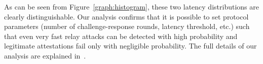 As can be seen from Figure~\ref{graph:histogram}, these two latency distributions are clearly distinguishable. Our analysis confirms that it is possible to set protocol parameters (number of challenge-response rounds, latency threshold, etc.) such that even very fast relay attacks can be detected with high probability and legitimate attestations fail only with negligible probability. The full details of our analysis are explained in~\cite{proximitee}.





